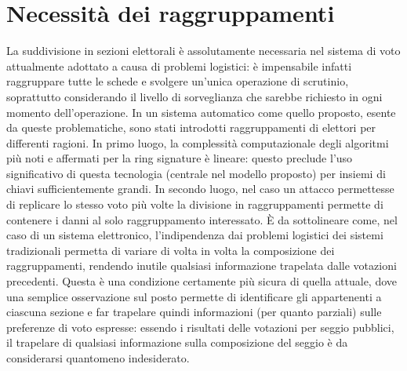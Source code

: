 \section{Necessità dei raggruppamenti}
	La suddivisione in sezioni elettorali è assolutamente necessaria nel sistema di voto attualmente adottato a causa di problemi logistici: è impensabile infatti raggruppare tutte le schede e svolgere un'unica operazione di scrutinio, soprattutto considerando il livello di sorveglianza che sarebbe richiesto in ogni momento dell'operazione. In un sistema automatico come quello proposto, esente da queste problematiche, sono stati introdotti raggruppamenti di elettori per differenti ragioni. In primo luogo, la complessità computazionale degli algoritmi più noti e affermati per la ring signature è lineare: questo preclude l'uso significativo di questa tecnologia (centrale nel modello proposto) per insiemi di chiavi sufficientemente grandi. In secondo luogo, nel caso un attacco permettesse di replicare lo stesso voto più volte la divisione in raggruppamenti permette di contenere i danni al solo raggruppamento interessato.
	È da sottolineare come, nel caso di un sistema elettronico, l'indipendenza dai problemi logistici dei sistemi tradizionali permetta di variare di volta in volta la composizione dei raggruppamenti, rendendo inutile qualsiasi informazione trapelata dalle votazioni precedenti. Questa è una condizione certamente più sicura di quella attuale, dove una semplice osservazione sul posto permette di identificare gli appartenenti a ciascuna sezione e far trapelare quindi informazioni (per quanto parziali) sulle preferenze di voto espresse: essendo i risultati delle votazioni per seggio pubblici, il trapelare di qualsiasi informazione sulla composizione del seggio è da considerarsi quantomeno indesiderato.

